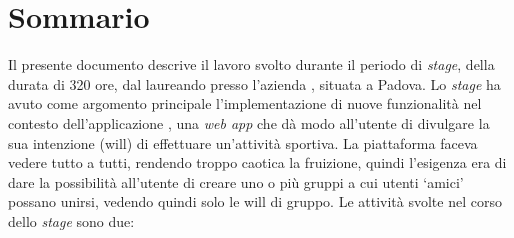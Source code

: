 
\cleardoublepage
{}
{}
\begingroup
\let\clearpage\relax
\let\cleardoublepage\relax
\let\cleardoublepage\relax

\chapter*{Sommario}

Il presente documento descrive il lavoro svolto durante il periodo di
\textit{stage},
della durata di 320 ore, dal laureando \myName\xspace presso
l'azienda \myCompany, situata a Padova.
Lo \textit{stage} ha avuto come argomento principale l'implementazione di nuove
funzionalità nel contesto dell'applicazione \productName, una
\textit{web app} che dà modo all'utente di divulgare la sua intenzione
(\gls{will}) di effettuare un'attività sportiva.
La piattaforma faceva vedere tutto a tutti, rendendo troppo caotica la
fruizione, quindi l'esigenza era di dare la possibilità all'utente
di creare uno o più gruppi a cui utenti \enquote*{amici} possano unirsi,
vedendo quindi solo le \gls{will} di gruppo.
Le attività svolte nel corso dello \textit{stage} sono due:
